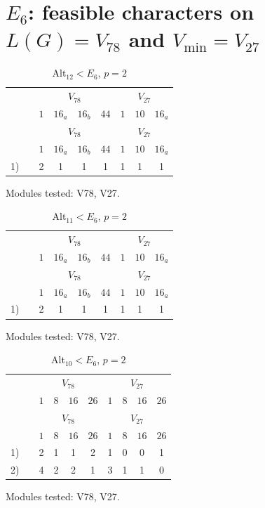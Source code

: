 \section*{$E_6$: feasible characters on $L(G) = V_{78}$ and $V_{\min} = V_{27}$}

\setcounter{table}{36}
\begin{longtable}{rc|cccc|ccc}
\caption{Alt$_{12} < E_6$, $p = 2$}\\
& & \multicolumn{4}{c|}{$V_{78}$} & \multicolumn{3}{c}{$V_{27}$} \\
& & $1$ & $16_{a}$ & $16_{b}$ & $44$ & $1$ & $10$ & $16_{a}$ \\ \hline
\endfirsthead
& & \multicolumn{4}{c|}{$V_{78}$} & \multicolumn{3}{c}{$V_{27}$} \\
& & $1$ & $16_{a}$ & $16_{b}$ & $44$ & $1$ & $10$ & $16_{a}$ \\ \hline
\endhead
1) &  & 2 & 1 & 1 & 1 & 1 & 1 & 1 \\
\end{longtable}
\noindent Modules tested: V78, V27.\\

\setcounter{table}{37}
\begin{longtable}{rc|cccc|ccc}
\caption{Alt$_{11} < E_6$, $p = 2$}\\
& & \multicolumn{4}{c|}{$V_{78}$} & \multicolumn{3}{c}{$V_{27}$} \\
& & $1$ & $16_{a}$ & $16_{b}$ & $44$ & $1$ & $10$ & $16_{a}$ \\ \hline
\endfirsthead
& & \multicolumn{4}{c|}{$V_{78}$} & \multicolumn{3}{c}{$V_{27}$} \\
& & $1$ & $16_{a}$ & $16_{b}$ & $44$ & $1$ & $10$ & $16_{a}$ \\ \hline
\endhead
1) &  & 2 & 1 & 1 & 1 & 1 & 1 & 1 \\
\end{longtable}
\noindent Modules tested: V78, V27.\\

\setcounter{table}{38}
\begin{longtable}{rc|cccc|cccc}
\caption{Alt$_{10} < E_6$, $p = 2$}\\
& & \multicolumn{4}{c|}{$V_{78}$} & \multicolumn{4}{c}{$V_{27}$} \\
& & $1$ & $8$ & $16$ & $26$ & $1$ & $8$ & $16$ & $26$ \\ \hline
\endfirsthead
& & \multicolumn{4}{c|}{$V_{78}$} & \multicolumn{4}{c}{$V_{27}$} \\
& & $1$ & $8$ & $16$ & $26$ & $1$ & $8$ & $16$ & $26$ \\ \hline
\endhead
1) &  & 2 & 1 & 1 & 2 & 1 & 0 & 0 & 1 \\
2) &  & 4 & 2 & 2 & 1 & 3 & 1 & 1 & 0 \\
\end{longtable}
\noindent Modules tested: V78, V27.\\

